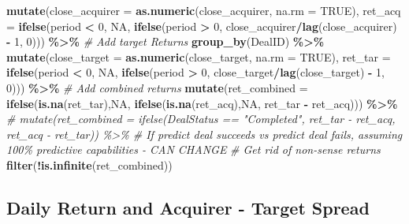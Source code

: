 \documentclass[
]{article}
\newenvironment{Shaded}{\begin{snugshade}}{\end{snugshade}}
\newcommand{\CommentTok}[1]{\textcolor[rgb]{0.56,0.35,0.01}{\textit{#1}}}
\newcommand{\DataTypeTok}[1]{\textcolor[rgb]{0.13,0.29,0.53}{#1}}
\newcommand{\DecValTok}[1]{\textcolor[rgb]{0.00,0.00,0.81}{#1}}
\newcommand{\KeywordTok}[1]{\textcolor[rgb]{0.13,0.29,0.53}{\textbf{#1}}}
\newcommand{\NormalTok}[1]{#1}
\newcommand{\OperatorTok}[1]{\textcolor[rgb]{0.81,0.36,0.00}{\textbf{#1}}}
\newcommand{\OtherTok}[1]{\textcolor[rgb]{0.56,0.35,0.01}{#1}}
\newcommand{\StringTok}[1]{\textcolor[rgb]{0.31,0.60,0.02}{#1}}
\begin{document}
\begin{Shaded}
\begin{Highlighting}[]
\StringTok{  }\KeywordTok{mutate}\NormalTok{(}\DataTypeTok{close\_acquirer =} \KeywordTok{as.numeric}\NormalTok{(close\_acquirer, }\DataTypeTok{na.rm =} \OtherTok{TRUE}\NormalTok{),}
    \DataTypeTok{ret\_acq =} \KeywordTok{ifelse}\NormalTok{(period }\OperatorTok{\textless{}}\StringTok{ }\DecValTok{0}\NormalTok{, }\OtherTok{NA}\NormalTok{, }\KeywordTok{ifelse}\NormalTok{(period }\OperatorTok{\textgreater{}}\StringTok{ }\DecValTok{0}\NormalTok{, close\_acquirer}\OperatorTok{/}\KeywordTok{lag}\NormalTok{(close\_acquirer) }\OperatorTok{{-}}\StringTok{ }\DecValTok{1}\NormalTok{, }\DecValTok{0}\NormalTok{))) }\OperatorTok{\%\textgreater{}\%}
\StringTok{  }
\StringTok{  }\CommentTok{\# Add target Returns}
\StringTok{  }\KeywordTok{group\_by}\NormalTok{(DealID) }\OperatorTok{\%\textgreater{}\%}
\StringTok{  }\KeywordTok{mutate}\NormalTok{(}\DataTypeTok{close\_target =} \KeywordTok{as.numeric}\NormalTok{(close\_target, }\DataTypeTok{na.rm =} \OtherTok{TRUE}\NormalTok{),}
    \DataTypeTok{ret\_tar =} \KeywordTok{ifelse}\NormalTok{(period }\OperatorTok{\textless{}}\StringTok{ }\DecValTok{0}\NormalTok{, }\OtherTok{NA}\NormalTok{, }\KeywordTok{ifelse}\NormalTok{(period }\OperatorTok{\textgreater{}}\StringTok{ }\DecValTok{0}\NormalTok{, close\_target}\OperatorTok{/}\KeywordTok{lag}\NormalTok{(close\_target) }\OperatorTok{{-}}\StringTok{ }\DecValTok{1}\NormalTok{, }\DecValTok{0}\NormalTok{))) }\OperatorTok{\%\textgreater{}\%}
\StringTok{  }
\StringTok{  }\CommentTok{\# Add combined returns}
\StringTok{  }
\StringTok{  }\KeywordTok{mutate}\NormalTok{(}\DataTypeTok{ret\_combined =}  \KeywordTok{ifelse}\NormalTok{(}\KeywordTok{is.na}\NormalTok{(ret\_tar),}\OtherTok{NA}\NormalTok{, }\KeywordTok{ifelse}\NormalTok{(}\KeywordTok{is.na}\NormalTok{(ret\_acq),}\OtherTok{NA}\NormalTok{, ret\_tar }\OperatorTok{{-}}\StringTok{ }\NormalTok{ret\_acq))) }\OperatorTok{\%\textgreater{}\%}\StringTok{ }
\StringTok{  }\CommentTok{\# mutate(ret\_combined = ifelse(DealStatus == "Completed", ret\_tar {-} ret\_acq,  ret\_acq {-} ret\_tar)) \%\textgreater{}\% \# If predict deal succeeds vs predict deal fails, assuming 100\% predictive capabilities {-} CAN CHANGE}
\StringTok{  }\CommentTok{\# Get rid of non{-}sense returns}
\StringTok{  }\KeywordTok{filter}\NormalTok{(}\OperatorTok{!}\KeywordTok{is.infinite}\NormalTok{(ret\_combined))}
\end{Highlighting}
\end{Shaded}

\hypertarget{daily-return-and-acquirer---target-spread}{%
\subsection{Daily Return and Acquirer - Target
Spread}\label{daily-return-and-acquirer---target-spread}}
\end{document}
